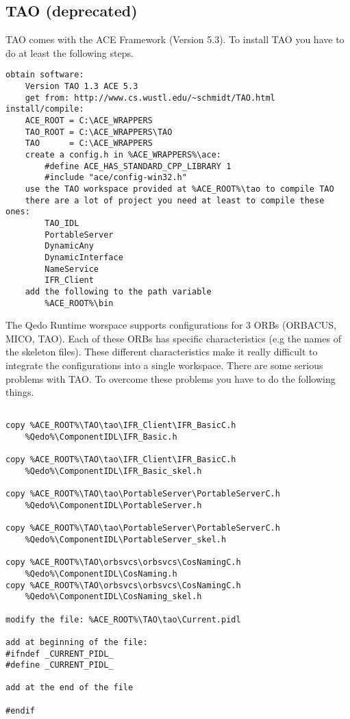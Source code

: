 \documentclass[12pt,a4paper]{report}
\begin{document}
\subsection{TAO (deprecated)}
\label{sec:TAODeprecated}

TAO comes with the ACE Framework (Version 5.3).
To install TAO you have to do at least the following steps.
\small
\begin{verbatim}
obtain software:
    Version TAO 1.3 ACE 5.3
    get from: http://www.cs.wustl.edu/~schmidt/TAO.html
install/compile:
    ACE_ROOT = C:\ACE_WRAPPERS
    TAO_ROOT = C:\ACE_WRAPPERS\TAO
    TAO      = C:\ACE_WRAPPERS
    create a config.h in %ACE_WRAPPERS%\ace:
        #define ACE_HAS_STANDARD_CPP_LIBRARY 1
        #include "ace/config-win32.h"
    use the TAO workspace provided at %ACE_ROOT%\tao to compile TAO
    there are a lot of project you need at least to compile these ones:
        TAO_IDL
        PortableServer
        DynamicAny
        DynamicInterface
        NameService
        IFR_Client
    add the following to the path variable
        %ACE_ROOT%\bin
\end{verbatim}
\normalsize

The Qedo Runtime worspace supports configurations for 3 ORBs (ORBACUS, MICO, TAO). Each of these ORBs has specific characteristics (e.g the names of the skeleton files). These different characteristics make it really difficult to integrate the configurations into a single workspace. There are some serious problems with TAO. To overcome these problems you have to do the following things.
\small
\begin{verbatim}

copy %ACE_ROOT%\TAO\tao\IFR_Client\IFR_BasicC.h
    %Qedo%\ComponentIDL\IFR_Basic.h

copy %ACE_ROOT%\TAO\tao\IFR_Client\IFR_BasicC.h
    %Qedo%\ComponentIDL\IFR_Basic_skel.h

copy %ACE_ROOT%\TAO\tao\PortableServer\PortableServerC.h
    %Qedo%\ComponentIDL\PortableServer.h

copy %ACE_ROOT%\TAO\tao\PortableServer\PortableServerC.h
    %Qedo%\ComponentIDL\PortableServer_skel.h

copy %ACE_ROOT%\TAO\orbsvcs\orbsvcs\CosNamingC.h
    %Qedo%\ComponentIDL\CosNaming.h
copy %ACE_ROOT%\TAO\orbsvcs\orbsvcs\CosNamingC.h
    %Qedo%\ComponentIDL\CosNaming_skel.h

modify the file: %ACE_ROOT%\TAO\tao\Current.pidl

add at beginning of the file:
#ifndef _CURRENT_PIDL_
#define _CURRENT_PIDL_

add at the end of the file

#endif

\end{verbatim}
\normalsize
\end{document}
